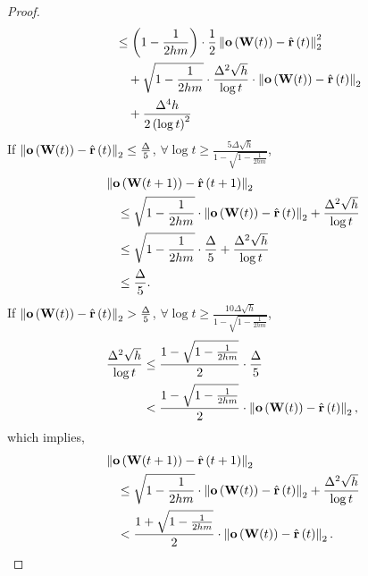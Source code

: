 \begin{proof}
\begin{equation*}
\begin{split}
    &\quad \le \left( 1 - \frac{1}{2 h m } \right) \cdot \frac{1}{2} \left\| {\mathbf{o}}\left( {\mathbf{W}}(t) \right) - \hat{{\mathbf{r}}}\left(t\right)\right\|_2^2 \\
    &\qquad + \sqrt{1 - \frac{1}{2 h m } } \cdot \frac{\Delta^2 \sqrt{h}}{\log{t}} \cdot \left\| {\mathbf{o}}\left( {\mathbf{W}}(t) \right) - \hat{{\mathbf{r}}}\left(t\right)\right\|_2 \\
    &\qquad + \frac{\Delta^4 h}{2 \left( \log{t} \right)^2 }
\end{split}
\end{equation*}
If $\left\| {\mathbf{o}}\left( {\mathbf{W}}(t) \right) - \hat{{\mathbf{r}}}\left(t\right)\right\|_2 \le \frac{\Delta}{5}$, $\forall \log{t} \ge \frac{5 \Delta \sqrt{h}}{1 - \sqrt{1 - \frac{1}{2 h m}}}$,
\begin{equation*}
\begin{split}
    &\left\| {\mathbf{o}}\left( {\mathbf{W}}(t+1) \right) - \hat{{\mathbf{r}}}\left(t+1\right)\right\|_2 \\
    &\quad \le \sqrt{1 - \frac{1}{2 h m}} \cdot \left\| {\mathbf{o}}\left( {\mathbf{W}}(t) \right) - \hat{{\mathbf{r}}}\left(t\right)\right\|_2 + \frac{\Delta^2 \sqrt{h}}{\log{t}} \\
    &\quad \le \sqrt{1 - \frac{1}{2 h m}} \cdot \frac{\Delta}{5} + \frac{\Delta^2 \sqrt{h}}{\log{t}} \\
    &\quad \le \frac{\Delta}{5}.
\end{split}
\end{equation*}
If $\left\| {\mathbf{o}}\left( {\mathbf{W}}(t) \right) - \hat{{\mathbf{r}}}\left(t\right)\right\|_2 > \frac{\Delta}{5}$, $\forall \log{t} \ge \frac{10 \Delta \sqrt{h}}{1 - \sqrt{1 - \frac{1}{2 h m}}}$,
\begin{equation*}
\begin{split}
    \frac{\Delta^2 \sqrt{h}}{\log{t}} &\le \frac{1 - \sqrt{1 - \frac{1}{2 h m}}}{2} \cdot \frac{\Delta}{5} \\
    &< \frac{1 - \sqrt{1 - \frac{1}{2 h m}}}{2} \cdot \left\| {\mathbf{o}}\left( {\mathbf{W}}(t) \right) - \hat{{\mathbf{r}}}\left(t\right)\right\|_2,
\end{split}
\end{equation*}
which implies,
\begin{equation*}
\begin{split}
    &\left\| \rvo\left( \rmW(t+1) \right) - \hat{\rvr}\left(t+1\right)\right\|_2 \\
    &\quad \le \sqrt{1 - \frac{1}{2 h m}} \cdot \left\| \rvo\left( \rmW(t) \right) - \hat{\rvr}\left(t\right)\right\|_2 + \frac{\Delta^2 \sqrt{h}}{\log{t}} \\
    &\quad < \frac{1 + \sqrt{1 - \frac{1}{2 h m}}}{2} \cdot \left\| \rvo\left( \rmW(t) \right) - \hat{\rvr}\left(t\right)\right\|_2.

\end{split}
\end{equation*}
\end{proof}
